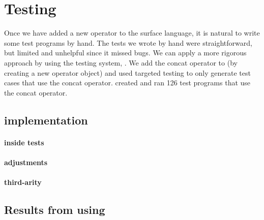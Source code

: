 \documentclass{article}
\begin{document}
\section{Testing}
Once we have added a new operator to the surface language, it is natural to write some test programs by hand. 
The tests we wrote by hand were straightforward, but limited and unhelpful since it missed bugs.
We can apply a more rigorous approach  by using the testing system, 
\checkname{}.
We add the concat operator to \checkname{} (by creating a new operator object)
and used targeted testing to only generate test cases that use the concat operator.
\checkname{} created and ran 126 test programs that use the concat operator.




 \subsection{\checkname{} implementation}
\paragraph{ inside tests}
\paragraph{adjustments}
 \paragraph{ third-arity}
\subsection{Results from using \checkname{}}
\end{document}
